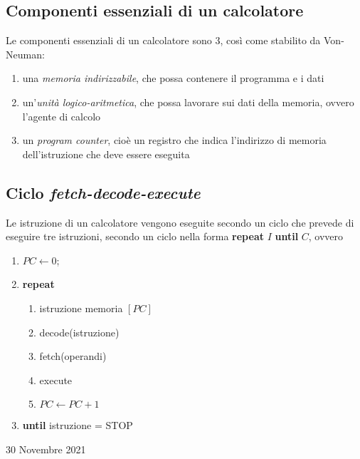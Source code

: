 \documentclass[a4paper]{extarticle}
\begin{document}
\vspace{1em}
\subsection{Componenti essenziali di un calcolatore}
Le componenti essenziali di un calcolatore sono \(3\), così come stabilito da Von-Neuman:
\begin{enumerate}
    \item una \textit{memoria indirizzabile}, che possa contenere il programma e i dati
    \item un'\textit{unità logico-aritmetica}, che possa lavorare sui dati della memoria, ovvero l'agente di calcolo
    \item un \textit{program counter}, cioè un registro che indica l'indirizzo di memoria dell'istruzione che deve essere eseguita
\end{enumerate}

\vspace{1em}
\noindent
\subsection{Ciclo \textit{fetch-decode-execute}}
Le istruzione di un calcolatore vengono eseguite secondo un ciclo che prevede di eseguire tre istruzioni, secondo un ciclo nella forma \textbf{repeat} \(I\) \textbf{until} \(C\), ovvero
\begin{enumerate}
    \item \(PC \leftarrow 0\);
    \item \textbf{repeat}
    \begin{enumerate}
        \item istruzione \leftarrow memoria \([PC]\)
        \item decode(istruzione)
        \item fetch(operandi)
        \item execute
        \item \(PC \leftarrow PC + 1\)
    \end{enumerate}
    \item \textbf{until} istruzione  = STOP
\end{enumerate}

\newpage
\begin{center}
    30 Novembre 2021
\end{center}
\end{document}
